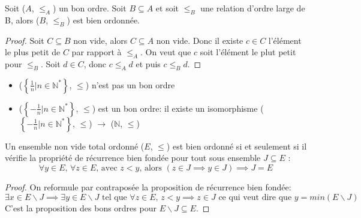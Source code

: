 \begin{prop}
	Soit ($A$, $\leqslant_A$) un bon ordre. Soit $B \subseteq A$ et soit $\leqslant_B$ une relation d'ordre large de B, alors ($B$, $\leqslant_B$) est bien ordonnée.
\end{prop}

\begin{proof}

	Soit $C \subseteq B$ non vide, alors $C \subseteq A$ non vide. Donc il existe $c \in C$ l'élément le plus petit de $C$ par rapport à $\leqslant_A$. On
	veut que $c$ soit l'élément le plut petit pour $\leqslant_B$. Soit $d \in C$, donc $c \leqslant_A d$ et puis $c \leqslant_B d$.

\end{proof}

\begin{example}
	\begin{itemize}
		\item ($\left\{\frac{1}{n} | n \in \mathbb{N}^*\right\}$, $\leqslant$) n'est pas un bon ordre
		\item ($\left\{-\frac{1}{n} | n \in \mathbb{N}^*\right\}$, $\leqslant$) est un bon ordre: il existe un isomorphisme ($\left\{-\frac{1}{n} | n \in \mathbb{N}^*\right\}$, $\leqslant$) $\to$ ($\mathbb{N}$, $\leqslant$)
	\end{itemize}
\end{example}

\begin{prop}

	Un ensemble non vide total ordonné ($E$, $\leqslant$) est bien ordonné si et seulement si il vérifie la propriété de récurrence bien fondée pour tout sous ensemble $J \subseteq E$ :
	\begin{equation*}
		\forall y \in E \text{, } \forall z \in E \text{, avec } z < y \text{, alors } (z \in J \implies y \in J) \implies J = E
	\end{equation*}
	\noindent

\end{prop}

\begin{proof}

	On reformule par contraposée la proposition de récurrence bien fondée:
	\begin{equation*}
		\exists x \in E\backslash J \implies \exists y \in E\backslash J \text{ tel que } \forall z \in E \text{, } z < y \implies z \in J \text{ ce qui veut dire que } y = min(E\backslash J)
	\end{equation*}
	\noindent
	C'est la proposition des bons ordres pour $E\backslash J \subseteq E$.

\end{proof}

